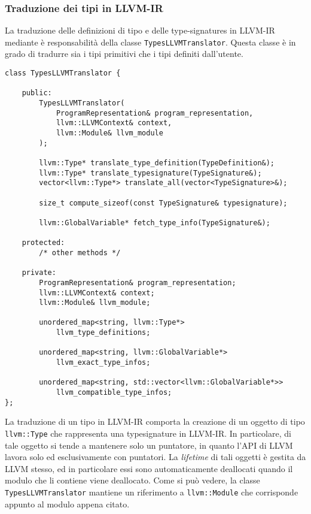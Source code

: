 \subsubsection{Traduzione dei tipi in LLVM-IR}
La traduzione delle definizioni di tipo e delle type-signatures in LLVM-IR mediante è responsabilità della classe 
\texttt{TypesLLVMTranslator}. Questa classe è in grado di tradurre sia i tipi primitivi che i tipi definiti dall'utente.

\vspace{0.5cm}
\begin{lstlisting}[frame=single]
class TypesLLVMTranslator {

    public:
        TypesLLVMTranslator(
            ProgramRepresentation& program_representation, 
            llvm::LLVMContext& context,
            llvm::Module& llvm_module
        );

        llvm::Type* translate_type_definition(TypeDefinition&);
        llvm::Type* translate_typesignature(TypeSignature&);
        vector<llvm::Type*> translate_all(vector<TypeSignature>&);

        size_t compute_sizeof(const TypeSignature& typesignature);

        llvm::GlobalVariable* fetch_type_info(TypeSignature&);

    protected:
        /* other methods */

    private:
        ProgramRepresentation& program_representation;
        llvm::LLVMContext& context;
        llvm::Module& llvm_module;

        unordered_map<string, llvm::Type*> 
            llvm_type_definitions;
        
        unordered_map<string, llvm::GlobalVariable*> 
            llvm_exact_type_infos;

        unordered_map<string, std::vector<llvm::GlobalVariable*>> 
            llvm_compatible_type_infos;
};
\end{lstlisting}
\vspace{0.5cm}

La traduzione di un tipo in LLVM-IR comporta la creazione di un oggetto di tipo \texttt{llvm::Type} che rappresenta
una typesignature in LLVM-IR. In particolare, di tale oggetto si tende a mantenere solo un puntatore, in quanto l'API di 
LLVM lavora solo ed esclusivamente con puntatori. La \textit{lifetime} di tali oggetti è gestita da LLVM stesso, ed in particolare essi sono 
automaticamente deallocati quando il modulo che li contiene viene deallocato. Come si può vedere, la classe \texttt{TypesLLVMTranslator}
mantiene un riferimento a \texttt{llvm::Module} che corrisponde appunto al modulo appena citato. \\ 

